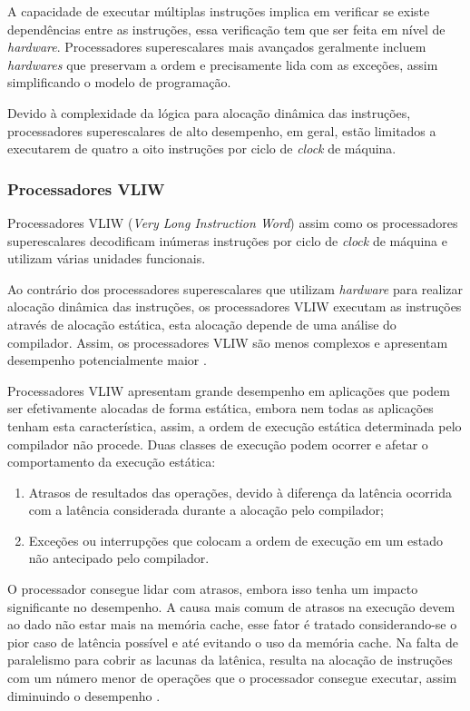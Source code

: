A capacidade de executar múltiplas instruções implica em verificar se existe
dependências entre as instruções, essa verificação tem que ser feita em nível de
\textit{hardware}. 
Processadores superescalares mais avançados geralmente incluem 
\textit{hardwares} que preservam a ordem e precisamente lida com as exceções, 
assim simplificando o modelo de programação.

Devido à complexidade da lógica para alocação dinâmica das instruções,
processadores superescalares de alto desempenho, em geral, estão limitados a
executarem de quatro a oito instruções por ciclo de \textit{clock} de máquina.


\subsubsection{Processadores VLIW}

Processadores VLIW (\textit{Very Long Instruction Word}) assim como os
processadores superescalares decodificam inúmeras instruções por ciclo de
\textit{clock} de máquina e utilizam várias unidades funcionais.

Ao contrário dos processadores superescalares que utilizam \textit{hardware}
para realizar alocação dinâmica das instruções, os processadores VLIW executam as 
instruções através de alocação estática, esta alocação depende de uma análise do
compilador.
Assim, os processadores VLIW são menos complexos e apresentam desempenho 
potencialmente maior \cite{eopc}.

Processadores VLIW apresentam grande desempenho em aplicações que podem ser 
efetivamente alocadas de forma estática, embora nem todas as aplicações
tenham esta característica, assim, a ordem de execução estática determinada pelo
compilador não procede. 
Duas classes de execução podem ocorrer e afetar o comportamento da execução 
estática:

\begin{enumerate}
        \item Atrasos de resultados das operações, devido à diferença da latência
                ocorrida com a latência considerada durante a alocação pelo
                compilador;
        \item Exceções ou interrupções que colocam a ordem de execução em um
                estado não antecipado pelo compilador.
\end{enumerate}

O processador consegue lidar com atrasos, embora isso tenha um impacto 
significante no desempenho. 
A causa mais comum de atrasos na execução devem ao dado não estar mais na 
memória cache, esse fator é tratado considerando-se o pior caso de latência 
possível e até evitando o uso da memória cache. 
Na falta de paralelismo para cobrir as lacunas da latênica, resulta na 
alocação de instruções com um número menor de operações que o processador 
consegue executar, assim diminuindo o desempenho \cite{ocfma}.


